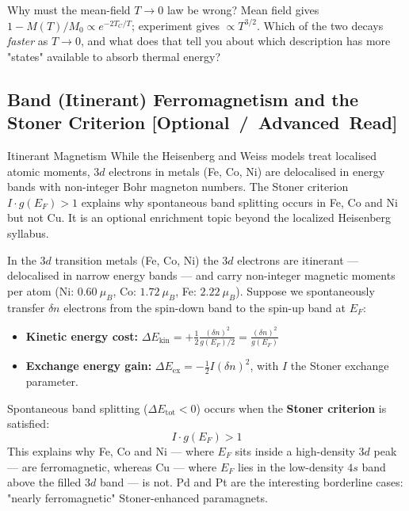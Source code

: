 \documentclass[11pt,a4paper]{article}
\newcommand{\extratag}{\hfill\mbox{\normalfont\footnotesize\sffamily\color{secondary}\textbf{[Optional / Advanced Read]}}}
\begin{document}
\begin{checkpointbox}{Why must the mean-field $T\to0$ law be wrong?}
Mean field gives $1 - M(T)/M_0 \propto e^{-2T_C/T}$; experiment gives $\propto T^{3/2}$. Which of the two decays \emph{faster} as $T\to0$, and what does that tell you about which description has more "states" available to absorb thermal energy?
\end{checkpointbox}

\subsection[Band Ferromagnetism \& Stoner Criterion (Optional Read)]{Band (Itinerant) Ferromagnetism and the Stoner Criterion \extratag}
\label{sec:stoner}

\begin{enrichmentnote}{Itinerant Magnetism}
While the Heisenberg and Weiss models treat localised atomic moments, $3d$ electrons in metals (Fe, Co, Ni) are delocalised in energy bands with non-integer Bohr magneton numbers. The Stoner criterion $I\cdot g(E_F) > 1$ explains why spontaneous band splitting occurs in Fe, Co and Ni but not Cu. It is an optional enrichment topic beyond the localized Heisenberg syllabus.
\end{enrichmentnote}

In the $3d$ transition metals (Fe, Co, Ni) the $3d$ electrons are itinerant --- delocalised in narrow energy bands --- and carry non-integer magnetic moments per atom (Ni: $0.60\ \mu_B$, Co: $1.72\ \mu_B$, Fe: $2.22\ \mu_B$). Suppose we spontaneously transfer $\delta n$ electrons from the spin-down band to the spin-up band at $E_F$:
\begin{itemize}[leftmargin=1.6cm]
    \item \textbf{Kinetic energy cost:} $\Delta E_{\mathrm{kin}} = +\frac{1}{2}\frac{(\delta n)^2}{g(E_F)/2} = \frac{(\delta n)^2}{g(E_F)}$
    \item \textbf{Exchange energy gain:} $\Delta E_{\mathrm{ex}} = -\frac{1}{2}I(\delta n)^2$, with $I$ the Stoner exchange parameter.
\end{itemize}
Spontaneous band splitting ($\Delta E_{\mathrm{tot}} < 0$) occurs when the \textbf{Stoner criterion} is satisfied:
\begin{equation}
    \boxed{\;I\cdot g(E_F) > 1\;}
    \label{eq:stoner}
\end{equation}
This explains why Fe, Co and Ni --- where $E_F$ sits inside a high-density $3d$ peak --- are ferromagnetic, whereas Cu --- where $E_F$ lies in the low-density $4s$ band above the filled $3d$ band --- is not. Pd and Pt are the interesting borderline cases: "nearly ferromagnetic" Stoner-enhanced paramagnets.
\end{document}
